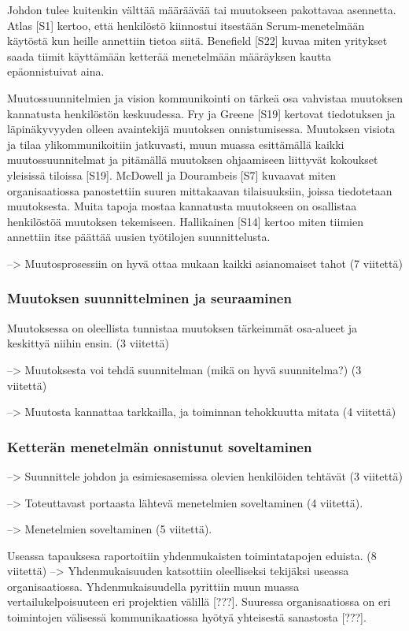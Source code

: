 Johdon tulee kuitenkin välttää määräävää tai muutokseen pakottavaa asennetta.
Atlas [S1] kertoo, että henkilöstö kiinnostui itsestään Scrum-menetelmään
käytöstä kun heille annettiin tietoa siitä. Benefield [S22] kuvaa miten
yritykset saada tiimit käyttämään ketterää menetelmään määräyksen kautta
epäonnistuivat aina.

Muutossuunnitelmien ja vision kommunikointi on tärkeä osa vahvistaa muutoksen
kannatusta henkilöstön keskuudessa. Fry ja Greene [S19] kertovat tiedotuksen ja
läpinäkyvyyden olleen avaintekijä muutoksen onnistumisessa. Muutoksen visiota ja
tilaa ylikommunikoitiin jatkuvasti, muun muassa esittämällä kaikki
muutossuunnitelmat ja pitämällä muutoksen ohjaamiseen liittyvät kokoukset
yleisissä tiloissa [S19]. McDowell ja Dourambeis [S7] kuvaavat miten
organisaatiossa panostettiin suuren mittakaavan tilaisuuksiin, joissa
tiedotetaan muutoksesta. Muita tapoja mostaa kannatusta muutokseen on osallistaa
henkilöstöä muutoksen tekemiseen. Hallikainen [S14] kertoo miten tiimien
annettiin itse päättää uusien työtilojen suunnittelusta.

--> Muutosprosessiin on hyvä ottaa mukaan kaikki asianomaiset tahot (7 viitettä)


\subsubsection{Muutoksen suunnittelminen ja seuraaminen}

Muutoksessa on oleellista tunnistaa muutoksen tärkeimmät osa-alueet ja keskittyä
niihin ensin. (3 viitettä)

--> Muutoksesta voi tehdä suunnitelman (mikä on hyvä suunnitelma?) (3 viitettä)

--> Muutosta kannattaa tarkkailla, ja toiminnan tehokkuutta mitata (4 viitettä)

\subsubsection{Ketterän menetelmän onnistunut soveltaminen}

--> Suunnittele johdon ja esimiesasemissa olevien henkilöiden tehtävät
(3 viitettä)

--> Toteuttavast portaasta lähtevä menetelmien soveltaminen (4 viitettä).

--> Menetelmien soveltaminen (5 viitettä).

Useassa tapauksesa raportoitiin yhdenmukaisten toimintatapojen eduista.
(8 viitettä)
--> Yhdenmukaisuuden katsottiin oleelliseksi tekijäksi useassa organisaatiossa.
Yhdenmukaisuudella pyrittiin muun muassa vertailukelpoisuuteen eri projektien
välillä [???]. Suuressa organisaatiossa on eri toimintojen välisessä
kommunikaatiossa hyötyä yhteisestä sanastosta [???].

